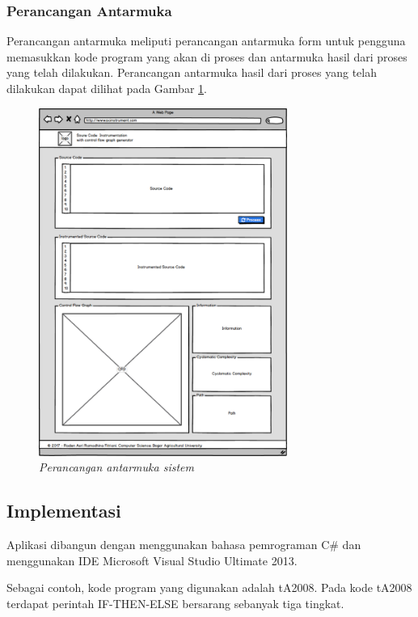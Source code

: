 \subsubsection*{Perancangan Antarmuka}
Perancangan antarmuka meliputi perancangan antarmuka form untuk pengguna memasukkan kode program yang akan di proses dan antarmuka hasil dari proses yang telah dilakukan. Perancangan antarmuka hasil dari proses yang telah dilakukan dapat dilihat pada Gambar \ref{fig:perancanganantarmuka}.
\begin{figure}[h!]
	\centering
	\includegraphics[width=230pt]{gambar/perancanganantarmuka}
	\caption{\textit{Perancangan antarmuka sistem}}
	\label{fig:perancanganantarmuka}
\end{figure}

\subsection*{Implementasi}

Aplikasi dibangun dengan menggunakan bahasa pemrograman C\# dan menggunakan IDE Microsoft Visual Studio Ultimate 2013. 

Sebagai contoh, kode program yang digunakan adalah tA2008. Pada kode tA2008 terdapat perintah IF-THEN-ELSE bersarang sebanyak tiga tingkat. 

